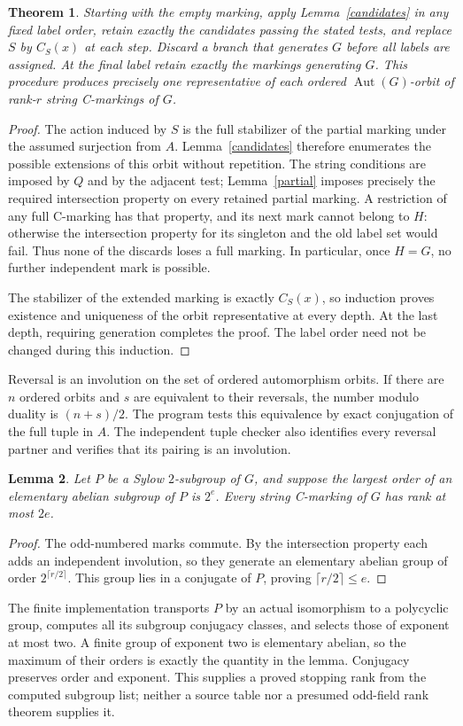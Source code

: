 \documentclass[11pt,a4paper]{article}
\newtheorem{lemma}{Lemma}
\newtheorem{theorem}[lemma]{Theorem}
\begin{document}
\begin{theorem}\label{enumeration}
Starting with the empty marking, apply Lemma~\ref{candidates} in any
fixed label order, retain exactly the candidates passing the stated
tests, and replace $S$ by $C_S(x)$ at each step. Discard a branch that
generates $G$ before all labels are assigned. At the final label retain
exactly the markings generating $G$. This procedure produces precisely
one representative of each ordered $\operatorname{Aut}(G)$-orbit of
rank-$r$ string C-markings of $G$.
\end{theorem}
\begin{proof}
The action induced by $S$ is the full stabilizer of the partial marking
under the assumed surjection from $A$. Lemma~\ref{candidates} therefore
enumerates the possible extensions of this orbit without repetition.
The string conditions are imposed by $Q$ and by the adjacent test;
Lemma~\ref{partial} imposes precisely the required intersection
property on every retained partial marking. A restriction of any full
C-marking has that property, and its next mark cannot belong to $H$:
otherwise the intersection property for its singleton and the old
label set would fail. Thus none of the discards loses a full marking.
In particular, once $H=G$, no further independent mark is possible.

The stabilizer of the extended marking is exactly $C_S(x)$, so
induction proves existence and uniqueness of the orbit representative
at every depth. At the last depth, requiring generation completes the
proof. The label order need not be changed during this induction.
\end{proof}

Reversal is an involution on the set of ordered automorphism orbits.
If there are $n$ ordered orbits and $s$ are equivalent to their
reversals, the number modulo duality is $(n+s)/2$. The program tests
this equivalence by exact conjugation of the full tuple in $A$.
The independent tuple checker also identifies every reversal partner
and verifies that its pairing is an involution.

\begin{lemma}\label{bound}
Let $P$ be a Sylow $2$-subgroup of $G$, and suppose the largest order of
an elementary abelian subgroup of $P$ is $2^e$. Every string C-marking
of $G$ has rank at most $2e$.
\end{lemma}
\begin{proof}
The odd-numbered marks commute. By the intersection property each adds
an independent involution, so they generate an elementary abelian
group of order $2^{\lceil r/2\rceil}$. This group lies in a conjugate
of $P$, proving $\lceil r/2\rceil\leq e$.
\end{proof}
The finite implementation transports $P$ by an actual isomorphism to a
polycyclic group, computes all its subgroup conjugacy classes, and
selects those of exponent at most two. A finite group of exponent two
is elementary abelian, so the maximum of their orders is exactly the
quantity in the lemma. Conjugacy preserves order and exponent. This
supplies a proved stopping rank from the computed subgroup list;
neither a source table nor a presumed odd-field rank theorem supplies it.
\end{document}
